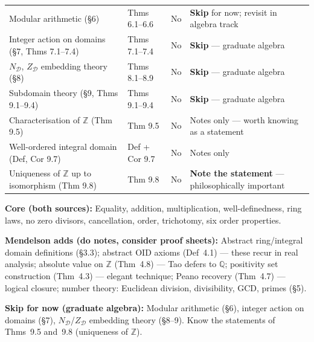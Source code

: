 \begin{tabular}{p{} p{} p{} p{}}
Modular arithmetic (\S{}6)
& Thms 6.1--6.6
& No
& \textbf{Skip} for now; revisit in algebra track
\\[6pt]

Integer action on domains (\S{}7, Thms 7.1--7.4)
& Thms 7.1--7.4
& No
& \textbf{Skip} --- graduate algebra
\\[6pt]

$N_\mathcal{D}$, $Z_\mathcal{D}$ embedding theory (\S{}8)
& Thms 8.1--8.9
& No
& \textbf{Skip} --- graduate algebra
\\[6pt]

Subdomain theory (\S{}9, Thms 9.1--9.4)
& Thms 9.1--9.4
& No
& \textbf{Skip} --- graduate algebra
\\[6pt]

Characterisation of $\mathbb{Z}$ (Thm 9.5)
& Thm 9.5
& No
& Notes only --- worth knowing as a statement
\\[6pt]

Well-ordered integral domain (Def, Cor 9.7)
& Def + Cor 9.7
& No
& Notes only
\\[6pt]

Uniqueness of $\mathbb{Z}$ up to isomorphism (Thm 9.8)
& Thm 9.8
& No
& \textbf{Note the statement} --- philosophically important
\\

\bottomrule
\end{tabular}

\begin{exposition}
\bigskip
\end{exposition}

\begin{tcolorbox}[colback=gray!6, colframe=gray!40, arc=2pt,
  left=6pt, right=6pt, top=4pt, bottom=4pt,
  title={\small\textbf{Summary: Recommended Coverage}},
  fonttitle=\small\bfseries]
\small
\textbf{Core (both sources):}
Equality, addition, multiplication, well-definedness, ring laws,
no zero divisors, cancellation, order, trichotomy, six order properties.

\medskip
\textbf{Mendelson adds (do notes, consider proof sheets):}
Abstract ring/integral domain definitions (\S3.3);
abstract OID axioms (Def~4.1) --- these recur in real analysis;
absolute value on $\mathbb{Z}$ (Thm~4.8) --- Tao defers to $\mathbb{Q}$;
positivity set construction (Thm~4.3) --- elegant technique;
Peano recovery (Thm~4.7) --- logical closure;
number theory: Euclidean division, divisibility, GCD, primes (\S{}5).

\medskip
\textbf{Skip for now (graduate algebra):}
Modular arithmetic (\S{}6), integer action on domains (\S{}7),
$N_\mathcal{D}$/$Z_\mathcal{D}$ embedding theory (\S{}8--9).
Know the statements of Thms~9.5 and~9.8 (uniqueness of $\mathbb{Z}$).
\end{tcolorbox}
